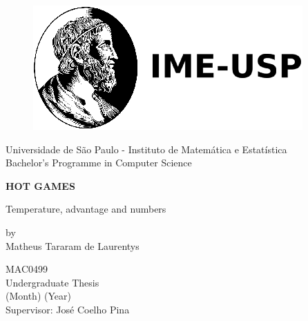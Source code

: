 \begin{titlepage}
\vspace*{-2.5cm}
\begin{figure}[H]
    \hspace*{-1.0cm}
    \vspace*{-0.5cm}
    \includegraphics[scale=0.4]{images/logo_ime.png}\\
\end{figure}

\noindent Universidade de São Paulo - Instituto de Matemática e Estatística\\
Bachelor's Programme in Computer Science
    \begin{center}
        \vspace*{1cm}
        
        {\LARGE \textbf{HOT GAMES}}
        
        \vspace{0.5cm}
        Temperature, advantage and numbers
        
        \vspace{1.5cm}
        by \\
        \vspace{1.5cm}
       Matheus Tararam de Laurentys
                
        \vspace{1.0cm}
    \end{center}

\vfill
\textcolor[rgb]{0.5,0.5,0.5}{
    \begin{flushleft}
    { \small
    MAC0499 \\
    Undergraduate Thesis \\
    (Month) (Year) \\
    Supervisor: José Coelho Pina \\
    }
    \end{flushleft}
}
      
\end{titlepage}